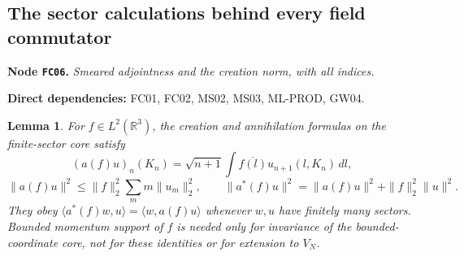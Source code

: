 \documentclass[11pt,a4paper]{article}
\newtheorem{lemma}[theorem]{Lemma}
\theoremstyle{remark}\newtheorem{remark}[theorem]{Remark}
\newcommand{\R}{\mathbb R}\newcommand{\C}{\mathbb C}\newcommand{\N}{\mathbb N}
\newcommand{\node}[3]{\par\Needspace{6\baselineskip}\smallskip\hypertarget{node:#1}{}\label{nodepage:#1}\noindent\textbf{Node \texttt{#1}.} \textit{#2.}\par\noindent\textbf{Direct dependencies:} #3.\par}
\begin{document}
\subsection{The sector calculations behind every field commutator}
\node{FC06}{Smeared adjointness and the creation norm, with all indices}{FC01, FC02, MS02, MS03, ML-PROD, GW04}
\begin{lemma}\label{lem:sectorcalculation}
For $f\in L^2(\R^3)$, the creation and annihilation formulas on the finite-sector core satisfy
\[
 (a(f)u)_n(K_n)=\sqrt{n+1}\int\overline{f(l)}u_{n+1}(l,K_n)\,dl,
\]
\[
 \|a(f)u\|^2\leq\|f\|_2^2\sum_m m\|u_m\|_2^2,
 \qquad \|a^*(f)u\|^2=\|a(f)u\|^2+\|f\|_2^2\|u\|^2.
\]
They obey $\langle a^*(f)w,u\rangle=\langle w,a(f)u\rangle$ whenever $w,u$ have finitely many sectors. Bounded momentum support of $f$ is needed only for invariance of the bounded-coordinate core, not for these identities or for extension to $V_N$.
\end{lemma}
\end{document}
